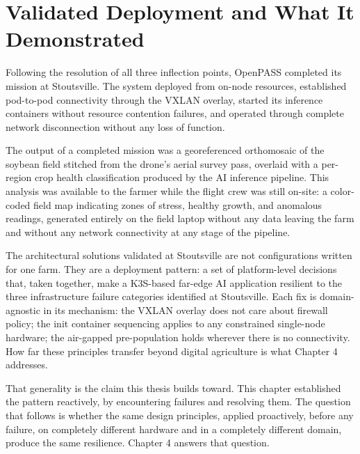 \section{Validated Deployment and What It Demonstrated}
\label{sec:ch3_validated}
Following the resolution of all three inflection points, OpenPASS completed its mission at Stoutsville. The system deployed from on-node resources, established pod-to-pod connectivity through the VXLAN overlay, started its inference containers without resource contention failures, and operated through complete network disconnection without any loss of function.

The output of a completed mission was a georeferenced orthomosaic of the soybean field stitched from the drone's aerial survey pass, overlaid with a per-region crop health classification produced by the AI inference pipeline. This analysis was available to the farmer while the flight crew was still on-site: a color-coded field map indicating zones of stress, healthy growth, and anomalous readings, generated entirely on the field laptop without any data leaving the farm and without any network connectivity at any stage of the pipeline.

The architectural solutions validated at Stoutsville are not configurations written for one farm. They are a deployment pattern: a set of platform-level decisions that, taken together, make a K3S-based far-edge AI application resilient to the three infrastructure failure categories identified at Stoutsville. Each fix is domain-agnostic in its mechanism: the VXLAN overlay does not care about firewall policy; the init container sequencing applies to any constrained single-node hardware; the air-gapped pre-population holds wherever there is no connectivity. How far these principles transfer beyond digital agriculture is what Chapter 4 addresses.

That generality is the claim this thesis builds toward. This chapter established the pattern reactively, by encountering failures and resolving them. The question that follows is whether the same design principles, applied proactively, before any failure, on completely different hardware and in a completely different domain, produce the same resilience. Chapter 4 answers that question.